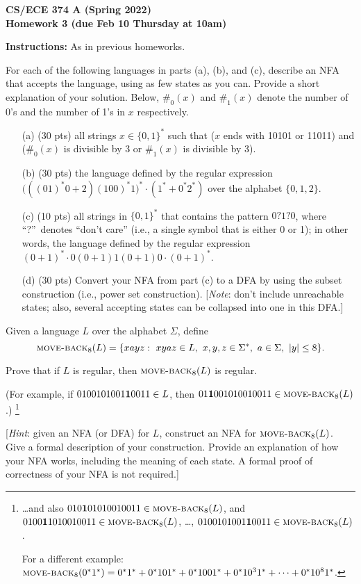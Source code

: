 \documentclass[11pt]{article}
\begin{document}
\begin{center}\Large\bf 
CS/ECE 374 A (Spring 2022)\\
{\Large Homework 3} (due Feb 10 Thursday at 10am)
\end{center}

\medskip\noindent
{\bf Instructions:} As in previous homeworks.


\begin{description}
\bigskip
\item[Problem 3.1:]
For each of the following languages in parts (a), (b), and (c),
describe an NFA that accepts the language, using as few states as you can.
Provide a short explanation of your solution.
Below, $\#_0(x)$ and $\#_1(x)$ denote the number of 0's and the number of 1's in $x$ respectively.
\begin{enumerate}
\item[(a)] (30 pts)
all strings $x\in\{0,1\}^*$ such that ($x$ ends with 10101 or 11011) and ($\#_0(x)$ is divisible by 3 or $\#_1(x)$ is divisible by 3).
\item[(b)] (30 pts)
the language defined by the regular expression
$\big( ((01)^*0+2)(100)^*1 \big)^* \cdot (1^*+0^*2^*)$ over the alphabet $\{0,1,2\}$.
\item[(c)] (10 pts)
all strings in $\{0,1\}^*$ that contains the pattern $0?1?0$, where ``?''\ denotes ``don't care'' (i.e.,
a single symbol that is either 0 or 1);
in other words, the language defined by the regular expression $(0+1)^*\cdot 0(0+1)1(0+1)0\cdot (0+1)^*$.
\item[(d)] (30 pts)
Convert your NFA from part (c) to a DFA by using the subset construction
(i.e., power set construction).  
[{\em Note}: don't include unreachable states; also, several accepting states can be collapsed into one in this DFA.]
\end{enumerate}


\bigskip
\item[Problem 3.2:]
Given a language $L$ over the alphabet $\Sigma$,
define
\newcommand{\BACK}{\textsc{move-back}_8}
\[ \BACK(L) = \{xayz:\ xyaz\in L,\ x,y,z\in\Sigma^*,\ a\in\Sigma,\ |y|\le 8\}.
\]

Prove that if $L$ is regular, then $\BACK(L)$ is regular.

(For example, if $0100101001{\bf 1}0011\in L$, then
$01{\bf 1}001010010011\in \BACK(L)$.)%
\footnote{
\ldots and also $010{\bf 1}01010010011\in \BACK(L)$, and $0100{\bf 1}1010010011\in \BACK(L)$, \ldots,
$0100101001{\bf 1}0011\in \BACK(L)$.

For a different example: $\BACK(0^*1^*) = 0^*1^* + 0^*101^* + 0^*1001^* + 0^*10^31^*+ \cdots + 0^*10^81^*$.
}

[{\em Hint}: given an NFA (or DFA) for $L$, construct an NFA for $\BACK(L)$.
Give a formal description of your construction.  Provide an explanation of
how your NFA works, including the meaning of each state.  A formal proof
of correctness of your NFA is not required.]



\end{description}
\end{document}
